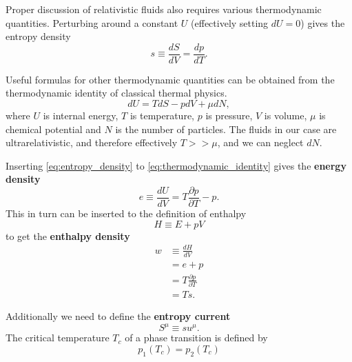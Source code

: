 Proper discussion of relativistic fluids also requires various thermodynamic quantities.
Perturbing around a constant $U$ (effectively setting $dU=0$) gives the entropy density
\cite[p. 23]{lecture_notes}
\begin{equation}
s \equiv \frac{dS}{dV} = \frac{dp}{dT}.
\label{eq:entropy_density}
\end{equation}

Useful formulas for other thermodynamic quantities can be obtained from the thermodynamic identity of classical thermal physics.
\cites[eq. 2.136]{rezzolla_relativistic_2013}[eq. 3.68]{schroeder_thermal_2000}
\begin{equation}
dU = TdS - pdV + \mu dN,
\label{eq:thermodynamic_identity}
\end{equation}
where $U$ is internal energy, $T$ is temperature, $p$ is pressure, $V$ is volume, $\mu$ is chemical potential and $N$ is the number of particles.
The fluids in our case are ultrarelativistic, and therefore effectively $T >> \mu$,
and we can neglect $dN$.

Inserting \eqref{eq:entropy_density} to \eqref{eq:thermodynamic_identity} gives the \textbf{energy density}
\begin{equation}
e \equiv \frac{dU}{dV} = T \frac{\partial p}{\partial T} - p.
\label{eq:energy_density}
\end{equation}
This in turn can be inserted to the definition of enthalpy
\cite[eq. 1.51]{schroeder_thermal_2000}
\begin{equation}
H \equiv E + pV
\end{equation}
to get the \textbf{enthalpy density}
\begin{align}
w
&\equiv \frac{dH}{dV} \\
&= e+p
\label{eq:enthalpy_sum} \\
&= T \frac{\partial p}{\partial T}
\label{eq:enthalpy_pressure}\\
&= Ts.
\label{eq:enthalpy_entropy}
\end{align}
\iffalse
Additionally we need to define the \textbf{specific enthalpy} \cite[eq. 2.141]{rezzolla_relativistic_2013}
\begin{equation}
h = \frac{e+p}{\rho},
\label{eq:specific_enthalpy}
\end{equation}
where $\rho$ is the rest-mass density, and the \textbf{entropy current}
\fi
Additionally we need to define the \textbf{entropy current}
\cite[p. 23]{lecture_notes}
\begin{equation}
S^\mu \equiv su^\mu.
\end{equation}
The critical temperature $T_c$ of a phase transition is defined by
\begin{equation}
p_1(T_c) = p_2(T_c)
\label{eq:critical_temp}
\end{equation}



